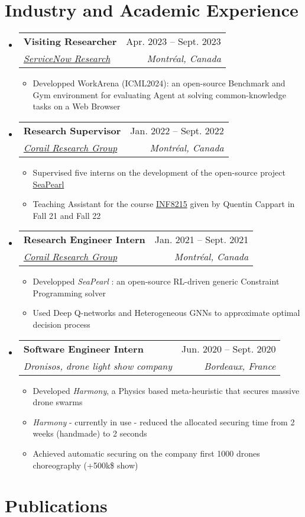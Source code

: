 \documentclass[letterpaper,11pt]{article}
\makeatletter
\newcommand{\resumeItem}[1]{
  \item\small{
    {#1 \vspace{-2pt}}
  }
}
\newcommand{\resumeSubheading}[4]{
  \vspace{-2pt}\item
    \begin{tabular*}{0.97\textwidth}[t]{l@{\extracolsep{\fill}}r}
      \textbf{#1} & #2 \\
      \textit{\small#3} & \textit{\small #4} \\
    \end{tabular*}\vspace{-7pt}
}
\newcommand{\resumeSubHeadingListStart}{\begin{itemize}[leftmargin=0.15in, label={}]}
\newcommand{\resumeSubHeadingListEnd}{\end{itemize}}
\newcommand{\resumeItemListStart}{\begin{itemize}}
\newcommand{\resumeItemListEnd}{\end{itemize}\vspace{-5pt}}
\makeatother
\begin{document}
\section{Industry and Academic Experience}
  \resumeSubHeadingListStart
      \resumeSubheading
      {Visiting Researcher}{Apr. 2023 -- Sept. 2023}
      {\href{https://corail-research.github.io/}{ServiceNow Research}}{Montréal, Canada}
    \resumeItemListStart
        \resumeItem{Developped WorkArena (ICML2024): an open-source Benchmark and Gym environment for evaluating Agent at solving common-knowledge tasks on a Web Browser}
      \resumeItemListEnd
      \resumeSubheading
      {Research Supervisor}{Jan. 2022 -- Sept. 2022}
      {\href{https://corail-research.github.io/}{Corail Research Group}}{Montréal, Canada}
    \resumeItemListStart
        \resumeItem{Supervised five interns on the development of the open-source project \href{https://github.com/corail-research/SeaPearl.jl}{SeaPearl}}
        \resumeItem{Teaching Assistant for the course \href{https://www.polymtl.ca/programmes/cours/intelligence-artif-methodes-et-algorithmes}{INF8215} given by Quentin Cappart in Fall 21 and Fall 22 }
      \resumeItemListEnd
    \resumeSubheading
      {Research Engineer Intern}{Jan. 2021 -- Sept. 2021}
      {\href{https://corail-research.github.io/}{Corail Research Group}}{Montréal, Canada}
    \resumeItemListStart
        \resumeItem{Developped {\textit{SeaPearl}} : an open-source RL-driven generic Constraint Programming solver}
        \resumeItem{Used Deep Q-networks and Heterogeneous GNNs to approximate optimal decision process}
    \resumeItemListEnd
    \resumeSubheading
      {Software Engineer Intern}{Jun. 2020 -- Sept. 2020}
      {Dronisos, drone light show company}{Bordeaux, France}
      \resumeItemListStart
        \resumeItem{Developed \textit{Harmony}, a Physics based meta-heuristic that secures massive drone swarms }
                \resumeItem{\textit{Harmony} - currently in use - reduced the allocated securing time from 2 weeks (handmade) to 2 seconds}
        \resumeItem{Achieved automatic securing on the company first 1000 drones choreography (+500k\$ show)}
      \resumeItemListEnd
    
  \resumeSubHeadingListEnd


\section{Publications}
\end{document}
